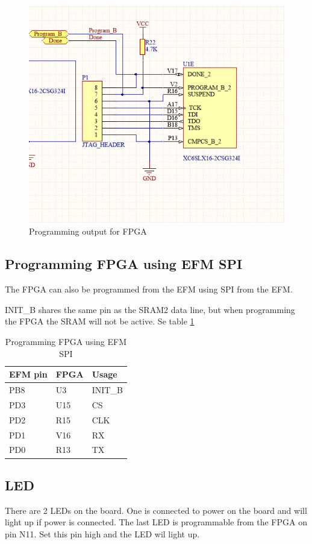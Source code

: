 \begin{figure}
    \includegraphics[width=\linewidth]{img/FPGA_Programmer.png}
    \caption{Programming output for FPGA}
    \label{fig:FpgaProgrammer}
\end{figure}

\subsection{Programming FPGA using EFM SPI}
The FPGA can also be programmed from the EFM using SPI from the EFM. 

INIT\_B shares the same pin as the SRAM2 data line, but when programming the FPGA the SRAM will not be active. Se table \ref{tab:SpiProgrammer}

\begin{table}[]
    \centering
    \begin{tabular}{lll}
        EFM pin & FPGA & Usage   \\
        \hline
        PB8     & U3   & INIT\_B \\
        PD3     & U15  & CS      \\
        PD2     & R15  & CLK     \\
        PD1     & V16  & RX      \\
        PD0     & R13  & TX
    \end{tabular}
    \caption{Programming FPGA using EFM SPI}
    \label{tab:SpiProgrammer}
\end{table}
\subsection{LED}
There are 2 LEDs on the board. One is connected to power on the board and will light up if power is connected. The last LED is programmable from the FPGA on pin N11. Set this pin high and the LED wil light up.
